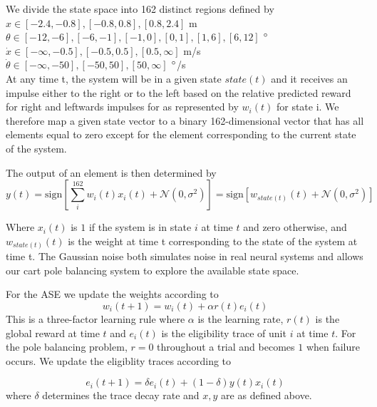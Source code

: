 \documentclass{article}
\begin{document}
We divide the state space into 162 distinct regions defined by\\
$x \in [-2.4,-0.8], [-0.8,0.8],[0.8,2.4]$ m\\
$\theta \in [-12,-6],[-6,-1],[-1,0],[0,1],[1,6],[6,12]$ $\degree$\\
$\dot x \in [-\infty,-0.5],[-0.5,0.5],[0.5,\infty]$ m/s\\
$\dot \theta \in [-\infty,-50],[-50,50],[50,\infty]$ $\degree$/s\\

At any time t, the system will be in a given state $state(t)$ and it receives an impulse either to the right or to the left based on the relative predicted reward for right and leftwards impulses for as represented by $w_i(t)$ for state i. We therefore map a given state vector to a binary 162-dimensional vector that has all elements equal to zero except for the element corresponding to the current state of the system.

The output of an element is then determined by
\begin{equation}
y(t) = \text{sign}[\sum_i^{162}{w_i(t)x_i(t)} + \mathcal{N}(0, \sigma^2)] = \text{sign}[w_{state(t)}(t) + \mathcal{N}(0, \sigma^2)] 
\end{equation}

Where $x_i(t)$ is $1$ if the system is in state $i$ at time $t$ and zero otherwise, and $w_{state(t)}(t)$ is the weight at time t corresponding to the state of the system at time t. The Gaussian noise both simulates noise in real neural systems and allows our cart pole balancing system to explore the available state space.

For the ASE we update the weights according to
\begin{equation}
w_i(t+1) = w_i(t) + \alpha r(t) e_i(t)
\end{equation}
This is a three-factor learning rule where $\alpha$ is the learning rate, $r(t)$ is the global reward at time $t$ and $e_i(t)$ is the eligibility trace of unit $i$ at time $t$. For the pole balancing problem, $r=0$ throughout a trial and becomes $1$ when failure occurs. We update the eligiblity traces according to

\begin{equation}
e_i(t+1) = \delta e_i(t) + (1-\delta) y(t) x_i(t)
\end{equation}
where $\delta$ determines the trace decay rate and $x, y$ are as defined above.
\end{document}
